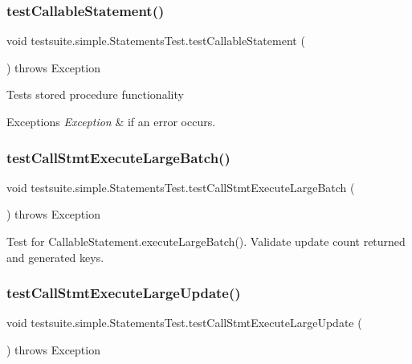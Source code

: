 \subsubsection{\texorpdfstring{test\+Callable\+Statement()}{testCallableStatement()}}
{\footnotesize\ttfamily void testsuite.\+simple.\+Statements\+Test.\+test\+Callable\+Statement (\begin{DoxyParamCaption}{ }\end{DoxyParamCaption}) throws Exception}

Tests stored procedure functionality


\begin{DoxyExceptions}{Exceptions}
{\em Exception} & if an error occurs. \\
\hline
\end{DoxyExceptions}
\mbox{\label{classtestsuite_1_1simple_1_1_statements_test_aefea78e355a622d7b5b0d79e11878cb7}} 
\subsubsection{\texorpdfstring{test\+Call\+Stmt\+Execute\+Large\+Batch()}{testCallStmtExecuteLargeBatch()}}
{\footnotesize\ttfamily void testsuite.\+simple.\+Statements\+Test.\+test\+Call\+Stmt\+Execute\+Large\+Batch (\begin{DoxyParamCaption}{ }\end{DoxyParamCaption}) throws Exception}

Test for Callable\+Statement.\+execute\+Large\+Batch(). Validate update count returned and generated keys. \mbox{\label{classtestsuite_1_1simple_1_1_statements_test_ade0670c0a2b079707bef4b4c243518c3}} 
\subsubsection{\texorpdfstring{test\+Call\+Stmt\+Execute\+Large\+Update()}{testCallStmtExecuteLargeUpdate()}}
{\footnotesize\ttfamily void testsuite.\+simple.\+Statements\+Test.\+test\+Call\+Stmt\+Execute\+Large\+Update (\begin{DoxyParamCaption}{ }\end{DoxyParamCaption}) throws Exception}

